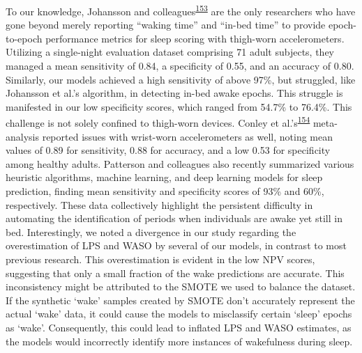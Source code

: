 \documentclass[
  9pt,
]{scrbook}
\begin{document}
To our knowledge, Johansson and
colleagues\textsuperscript{\protect\hyperlink{ref-johansson_development_2023}{153}}
are the only researchers who have gone beyond merely reporting ``waking
time'' and ``in-bed time'' to provide epoch-to-epoch performance metrics
for sleep scoring with thigh-worn accelerometers. Utilizing a
single-night evaluation dataset comprising 71 adult subjects, they
managed a mean sensitivity of 0.84, a specificity of 0.55, and an
accuracy of 0.80. Similarly, our models achieved a high sensitivity of
above 97\%, but struggled, like Johansson et al.'s algorithm, in
detecting in-bed awake epochs. This struggle is manifested in our low
specificity scores, which ranged from 54.7\% to 76.4\%. This challenge
is not solely confined to thigh-worn devices. Conley et
al.'s\textsuperscript{\protect\hyperlink{ref-conley_agreement_2019}{154}}
meta-analysis reported issues with wrist-worn accelerometers as well,
noting mean values of 0.89 for sensitivity, 0.88 for accuracy, and a low
0.53 for specificity among healthy adults. Patterson and colleagues also
recently summarized various heuristic algorithms, machine learning, and
deep learning models for sleep prediction, finding mean sensitivity and
specificity scores of 93\% and 60\%, respectively. These data
collectively highlight the persistent difficulty in automating the
identification of periods when individuals are awake yet still in bed.
Interestingly, we noted a divergence in our study regarding the
overestimation of LPS and WASO by several of our models, in contrast to
most previous research. This overestimation is evident in the low NPV
scores, suggesting that only a small fraction of the wake predictions
are accurate. This inconsistency might be attributed to the SMOTE we
used to balance the dataset. If the synthetic `wake' samples created by
SMOTE don't accurately represent the actual `wake' data, it could cause
the models to misclassify certain `sleep' epochs as `wake'.
Consequently, this could lead to inflated LPS and WASO estimates, as the
models would incorrectly identify more instances of wakefulness during
sleep.
\end{document}
